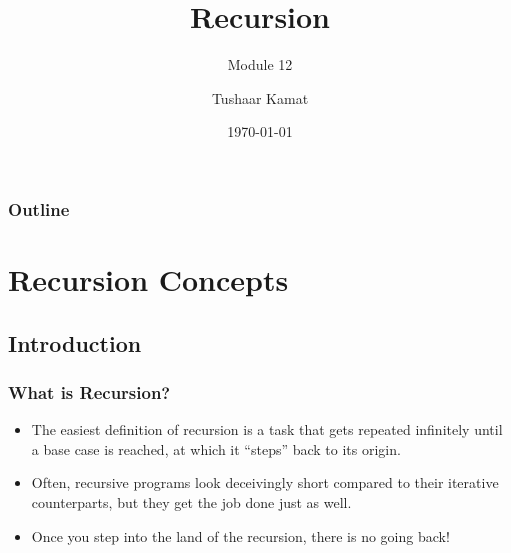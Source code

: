\message{ !name(recursion.tex)}\documentclass[fleqn, t]{beamer}
\title{Recursion}
\subtitle{Module 12}
\author{Tushaar Kamat}
\date{\today}
\begin{document}


\maketitle

\begin{frame}
  \frametitle{Outline}
  \tableofcontents
\end{frame}

\section{Recursion Concepts}
\subsection{Introduction}
\begin{frame}
  \frametitle{What is Recursion?}
  \begin{itemize}[<+->]
  \item The easiest definition of recursion is a task that gets repeated
    infinitely until a base case is reached, at which it ``steps'' back to its
    origin. 
  \item Often, recursive programs look deceivingly short compared to their
    iterative counterparts, but they get the job done just as well.
  \item Once you step into the land of the recursion, there is no going back!
  \end{itemize}
  \begin{figure}
  \end{figure}

\end{frame}
\end{document}
